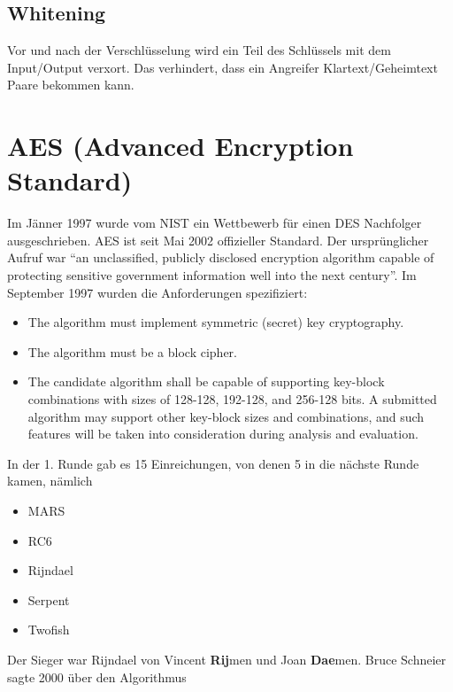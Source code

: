 \subsection{Whitening}

Vor und nach der Verschlüsselung wird ein Teil des Schlüssels mit dem Input/Output verxort. Das verhindert, dass ein Angreifer Klartext/Geheimtext Paare bekommen kann.

\section{AES (Advanced Encryption Standard)}

Im Jänner 1997 wurde vom NIST ein Wettbewerb für einen DES Nachfolger ausgeschrieben.
AES ist seit Mai 2002 offizieller Standard. Der ursprünglicher Aufruf war ``an unclassified, publicly disclosed encryption algorithm capable of protecting sensitive 
government information well into the next century''.
Im September 1997 wurden die Anforderungen spezifiziert:

\begin{itemize}
    \item The algorithm must implement symmetric (secret) key cryptography.
    \item The algorithm must be a block cipher.
    \item The candidate algorithm shall be capable of supporting key-block combinations with sizes of 128-128, 192-128, and 256-128 bits. A submitted algorithm may support 
other key-block sizes and combinations, and such features will be taken into consideration during analysis and evaluation.
\end{itemize}

In der 1. Runde gab es 15 Einreichungen, von denen 5 in die nächste Runde kamen, nämlich 

\begin{itemize}
    \item MARS 
    \item RC6
    \item Rijndael 
    \item Serpent 
    \item Twofish
\end{itemize}

Der Sieger war Rijndael von Vincent \textbf{Rij}men und Joan \textbf{Dae}men. Bruce Schneier sagte 2000 über den Algorithmus 


